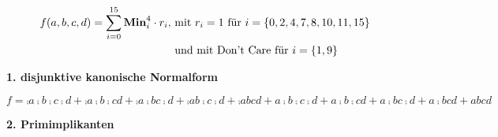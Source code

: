 \documentclass{CInf_practice}
\begin{document}
	

\cinftitle


\begin{align*}
f(a,b,c,d) = \sum\limits^{15}_{i=0} \text{\bf Min}^{4}_i \cdot r_i, &\text{ mit } r_i=1 \text{ für } i = \left\{0,2,4,7,8,10,11,15\right\}\\
& \text{ und mit Don't Care für } i=\left\{1,9\right\}
\end{align*}


\textbf{1. disjunktive kanonische Normalform}

$f = \comp a \comp b \comp c \comp d
   + \comp a \comp b \comp c       d
   + \comp a \comp b       c \comp d 
   + \comp a       b \comp c \comp d
   + \comp a       b       c       d 
   +       a \comp b \comp c \comp d
   +       a \comp b \comp c       d   
   +       a \comp b       c \comp d 
   +       a \comp b       c       d 
   +       a       b       c       d$

\bigskip

\textbf{2. Primimplikanten}
\end{document}
